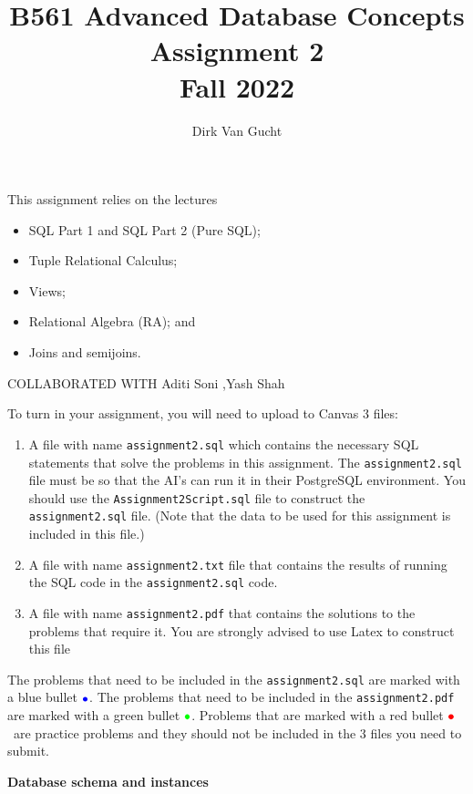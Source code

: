 \documentclass[11pt]{article}
\newcommand{\red}[1]{{\color{red}#1}}
\newcommand{\green}[1]{{\color{green}#1}}
\newcommand{\blue}[1]{{\color{blue}#1}}
\newcommand{\redbullet}{$\red{\bullet}$}
\newcommand{\greenbullet}{$\green{\bullet}$}
\newcommand{\bluebullet}{$\blue{\bullet}$}
\begin{document}
\title{B561 Advanced Database Concepts \\Assignment 2 \\Fall 2022}
\author{Dirk Van Gucht}
\date{}
\maketitle

This {assignment} relies on the lectures
\begin{itemize}

\item SQL Part 1 and SQL Part 2 (Pure SQL);
\item Tuple Relational Calculus;
\item Views;
\item Relational Algebra (RA);  and 
\item Joins and semijoins. 
\end{itemize}
COLLABORATED WITH Aditi Soni ,Yash Shah

To turn in your assignment, you will need to upload to Canvas 3 files:
\begin{enumerate}
\item A file with name {\tt assignment2.sql} which contains 
the necessary SQL statements that solve the problems in this assignment.   
The {\tt assignment2.sql} file must be so that the AI's can run it in their PostgreSQL environment.  You should use the {\tt Assignment2Script.sql} file to construct the {\tt assignment2.sql} file. (Note that the data to be used for this assignment is included in this file.)
\item A file with name {\tt assignment2.txt} file that contains the results of running the SQL code in the {\tt assignment2.sql} code.
\item A file with name {\tt assignment2.pdf} that contains the solutions to the problems that require it. You are strongly advised to use Latex to construct this file
\end{enumerate}


The problems that need to be included in the {\tt assignment2.sql} are marked with a blue bullet \bluebullet.
The problems that need to be included in the {\tt assignment2.pdf} are marked with a green bullet \greenbullet.
Problems that are marked with a red bullet \redbullet\  are practice problems and they should not be included in the 3 files you need to submit.



\newpage
\noindent
\large{\bf Database schema and instances}
\bigskip
\end{document}
